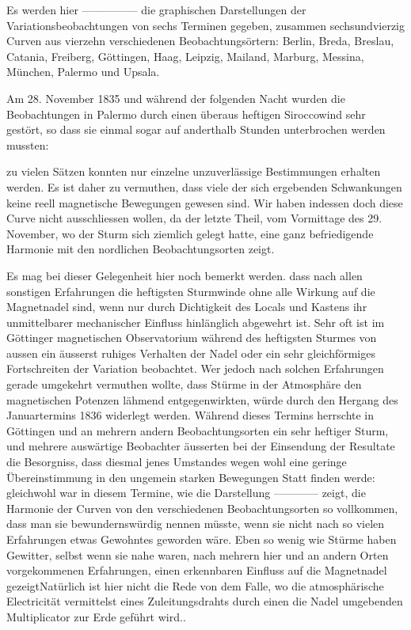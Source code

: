 Es werden hier ---\quad---\quad---\quad---\quad--- die graphischen Darstellungen der Variationsbeobachtungen von sechs Terminen gegeben, zusammen sechsundvierzig Curven aus vierzehn verschiedenen Beobachtungsörtern: Berlin, Breda, Breslau, Catania, Freiberg, Göttingen, Haag, Leipzig, Mailand, Marburg, Messina, München, Palermo und Upsala.
\par\smallskip\noindent\hspace*{.07\linewidth}\makebox[.93\linewidth][s]{---\hfill---\hfill---\hfill---\hfill---\hfill---\hfill---\hfill---\hfill---\hfill---\hfill---\hfill---\hfill---\hfill---\hfill---}\par\smallskip
Am 28. November 1835 und während der folgenden Nacht wurden die Beobachtungen in Palermo durch einen überaus heftigen Siroccowind sehr gestört, so dass sie einmal sogar auf anderthalb Stunden unterbrochen werden mussten:
\par
\clearpage
{}
\noindent zu vielen Sätzen konnten nur einzelne unzuverlässige Bestimmungen erhalten werden. Es ist daher zu vermuthen, dass viele der sich ergebenden Schwankungen keine reell magnetische Bewegungen gewesen sind. Wir haben indessen doch diese Curve nicht ausschliessen wollen, da der letzte Theil, vom Vormittage des 29. November, wo der Sturm sich ziemlich gelegt hatte, eine ganz befriedigende Harmonie mit den nordlichen Beobachtungsorten zeigt.

Es mag bei dieser Gelegenheit hier noch bemerkt werden. dass nach allen sonstigen Erfahrungen die heftigsten Sturmwinde ohne alle Wirkung auf die Magnetnadel sind, wenn nur durch Dichtigkeit des Locals und Kastens ihr unmittelbarer mechanischer Einfluss hinlänglich abgewehrt ist. Sehr oft ist im Göttinger magnetischen Observatorium während des heftigsten Sturmes von aussen ein äusserst ruhiges Verhalten der Nadel oder ein sehr gleichförmiges Fortschreiten der Variation beobachtet. Wer jedoch nach solchen Erfahrungen gerade umgekehrt vermuthen wollte, dass Stürme in der Atmosphäre den magnetischen Potenzen lähmend entgegenwirkten, würde durch den Hergang des Januartermins 1836 widerlegt werden. Während dieses Termins herrschte in Göttingen und an mehrern andern Beobachtungsorten ein sehr heftiger Sturm, und mehrere auswärtige Beobachter äusserten bei der Einsendung der Resultate die Besorgniss, dass diesmal jenes Umstandes wegen wohl eine geringe Übereinstimmung in den ungemein starken Bewegungen Statt finden werde: gleichwohl war in diesem Termine, wie die Darstellung ---\quad---\quad---\quad--- zeigt, die Harmonie der Curven von den verschiedenen Beobachtungsorten so vollkommen, dass man sie bewundernswürdig nennen müsste, wenn sie nicht nach so vielen Erfahrungen etwas Gewohntes geworden wäre. Eben so wenig wie Stürme haben Gewitter, selbst wenn sie nahe waren, nach mehrern hier und an andern Orten vorgekommenen Erfahrungen, einen erkennbaren Einfluss auf die Magnetnadel gezeigt\expandafter\def\csname HistoricalNoteText575\endcsname{Natürlich ist hier nicht die Rede von dem Falle, wo die atmosphärische Electricität vermittelst eines Zuleitungsdrahts durch einen die Nadel umgebenden Multiplicator zur Erde geführt wird.}.

